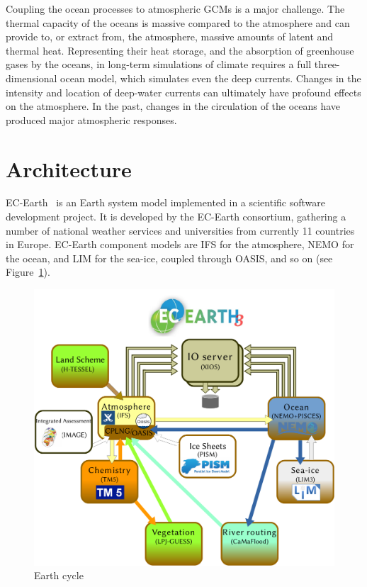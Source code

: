 Coupling the ocean processes to atmospheric \glspl{GCM} is a major challenge. The thermal capacity of the oceans is massive compared to 
the atmosphere and can provide to, or extract from, the atmosphere, massive amounts of latent and thermal heat. Representing their 
heat storage, and the absorption of greenhouse gases by the oceans, in long-term simulations of climate requires a full three-dimensional 
ocean model, which simulates even the deep currents. Changes in the intensity and location of deep-water currents can ultimately have 
profound effects on the atmosphere. In the past, changes in the circulation of the oceans have produced major atmospheric responses. 





\section{Architecture}
EC-Earth~\cite{Hazeleger2010,Hazeleger2012} is an Earth system model implemented in a scientific software development project. %
It is developed by the EC-Earth consortium, gathering a number of national weather services 
and universities from currently 11 countries in Europe. EC-Earth component models are IFS for the atmosphere, 
\acrshort{NEMO} for the ocean, and LIM for the sea-ice, coupled through OASIS, and so on (see Figure~\ref{fig:ecearth}). 



\begin{figure}[h!]
    \centering
    \includegraphics[scale=0.5]{figs/cw2015-ec-earth}
    \caption{Earth cycle} %
    \label{fig:ecearth}
\end{figure}

